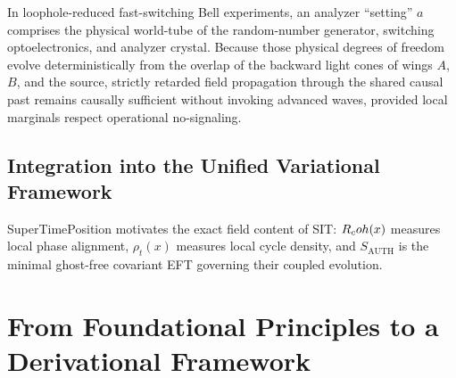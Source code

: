 In loophole-reduced fast-switching Bell experiments, an analyzer ``setting'' $a$ comprises the physical world-tube of the random-number generator, switching optoelectronics, and analyzer crystal. Because those physical degrees of freedom evolve deterministically from the overlap of the backward light cones of wings $A$, $B$, and the source, strictly retarded field propagation through the shared causal past remains causally sufficient without invoking advanced waves, provided local marginals respect operational no-signaling.

\subsection{Integration into the Unified Variational Framework}

SuperTimePosition motivates the exact field content of SIT: $R_coh(x)$ measures local phase alignment, $\rho_t(x)$ measures local cycle density, and $S_{\mathrm{AUTH}}$ is the minimal ghost-free covariant EFT governing their coupled evolution.

\section{From Foundational Principles to a Derivational Framework}
\label{app:derivational-framework}


